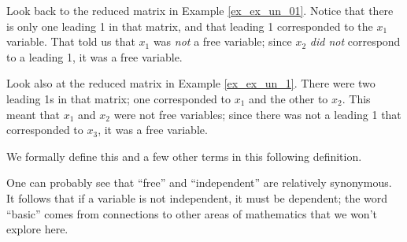 Look back to the reduced matrix in Example \ref{ex_ex_un_01}. Notice that there is only one leading 1 in that matrix, and that leading 1 corresponded to the $x_1$ variable. That told us that $x_1$ was \textit{not} a free variable; since $x_2$ \textit{did not} correspond to a leading 1, it was a free variable.

Look also at the reduced matrix in Example \ref{ex_ex_un_1}. There were two leading 1s in that matrix; one corresponded to $x_1$ and the other to $x_2$. This meant that $x_1$ and $x_2$ were not free variables; since there was not a leading 1 that corresponded to $x_3$, it was a free variable. 

We formally define this and a few other terms in this following definition.

\smallskip


\smallskip

One can probably see that ``free'' and ``independent'' are relatively synonymous. It follows that if a variable is not independent, it must be dependent; the word ``basic'' comes from connections to other areas of mathematics that we won't explore here.




